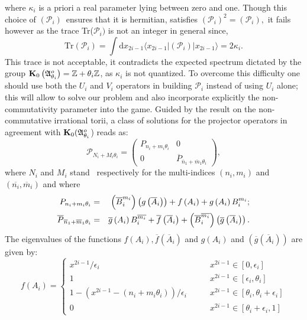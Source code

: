 \documentclass[a4paper,12pt]{article}
\begin{document}
where $\kappa _{i}$ is a priori a real parameter lying between zero and one.
Though this choice of $(\mathcal{P}_{i})$\ ensures that it is hermitian, satisfies $%
(\mathcal{P}_{i})^{2}=(\mathcal{P}_{i}),$ it fails however as the trace Tr($\mathcal{P}_{i})$ is
not an integer in general since,
\begin{equation}
\text{Tr}(\mathcal{P}_{i})=\int \text{d}x_{2i-1}\langle x_{2i-1}|(\mathcal{P}
_{i})|x_{2i-1}\rangle =2\kappa _{i}.
\end{equation}
This trace is not acceptable, it contradicts the expected spectrum dictated
by the group $\mathbf{K}_{0}\left( \frak{A}^{o}_{\theta _{i}}\right) =\mathbb{Z}%
+\theta _{i}\mathbb{Z}$, as $\kappa _{i}$ is not quantized. To
overcome this difficulty one should use both the $U_{i}$ and
$V_{i}$ operators in building $\mathcal{P}_{i}$ instead of using
$U_{i}$ alone; this will allow to solve our problem and also
incorporate explicitly the non-commutativity parameter into the
game. Guided by the result on the non-commutative irrational
torii, a
class of solutions for the projector operators in agreement with $\mathbf{K}%
_{0}(\frak{A}^{o}_{\theta _{i}}$) reads as:
\begin{equation}
\mathcal{P}_{N_{i}+M_{i}\theta _{i}}=\left(
\begin{array}{cc}
P_{n_{i}+m_{i}\theta _{i}} & 0 \\
0 & \overline{P}_{\overline{n}_{1}+\overline{m}_{1}\theta _{i}}
\end{array}
\right) ,  \label{irrprojector}
\end{equation}
where $N_{i}$ and $M_{i}$ stand \ respectively for the multi-indices $%
(n_{i},m_{i})$ and $(\overline{n_{i}},\overline{m}_{i})$ and where
\begin{eqnarray}
P_{n_{i}+m_{i}\theta _{i}} &=&\left( \overline{B}_{i}^{m_{i}}\right) \left(
g\left( \overline{A}_{i}\right) \right) +f\left( A_{i}\right) +g\left(
A_{i}\right) B_{i}^{m_{i}};\notag \\
\overline{P}_{\overline{n}_{1}+\overline{m}_{1}\theta _{i}} &=&\overline{g}%
\left( A_{i}\right) B_{i}^{\overline{m_{i}}}+\overline{f}\left( \overline{A}%
_{i}\right) +\left( \overline{B}_{i}^{\overline{m_{i}}}\right) \left(
\overline{g}\left( \overline{A}_{i}\right) \right) .\label{pbarp}
\end{eqnarray}
The eigenvalues of the functions $f(A_{i}),\overline{f}\left( \overline{A}%
_{i}\right) $ and $g\left( A_{i}\right) $ and $\left({\overline g}\left( \overline{A}%
_{i}\right) \right) $ are given by:
\begin{equation}
f\left( A_{i}\right) =\left\{
\begin{array}{ll}
x^{2i-1}/\epsilon _{i} & x^{2i-1}\in \left[ 0,\epsilon _{i}\right] \\
1 & x^{2i-1}\in \left[ \epsilon _{i},\theta _{i}\right] \\
1-\left( x^{2i-1}-(n_{i}+m_{i}\theta _{i})\right) /\epsilon _{i}\quad \quad
& x^{2i-1}\in \left[ \theta _{i},\theta _{i}+\epsilon _{i}\right] \\
0 & x^{2i-1}\in \left[ \theta _{i}+\epsilon _{i},1\right]
\end{array}
\right.
\end{equation}
\end{document}
